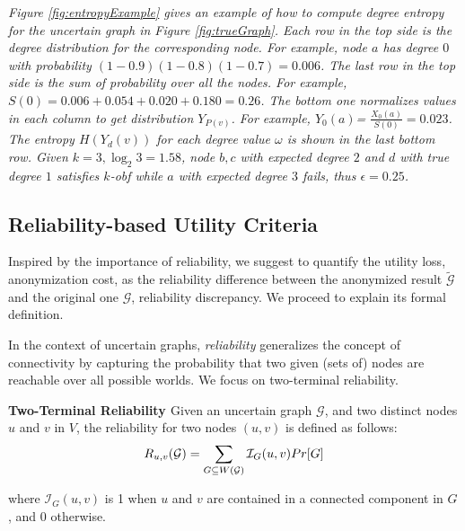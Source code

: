 {\emph{Figure \ref{fig:entropyExample}  gives an example of how to compute degree entropy for the uncertain graph in Figure \ref{fig:trueGraph}. Each row in the top side is the degree distribution for the corresponding node. For example, node $a$ has degree $0$ with probability $(1-0.9)(1-0.8)(1-0.7)=0.006$. The last row in the top side is the sum of probability over all the nodes. For example, $S(0)=0.006+0.054+0.020+0.180=0.26$.
The bottom one normalizes values in each column to get distribution $Y_{P(v)}$. For example, $Y_{0}(a)$= $\frac{X_{0}(a)}{S(0)}=0.023$. The entropy $H(Y_d(v))$ for each degree value $\omega$ is shown in the last bottom row. Given $k=3, \log_{2}{3}=1.58$, node $b,c$ with expected degree $2$ and $d$ with true degree $1$ satisfies $k$-obf while $a$ with expected degree $3$ fails, thus $\epsilon=0.25$. }

\subsection{Reliability-based Utility Criteria}
Inspired by the importance of reliability, we suggest to quantify the utility loss, anonymization cost, as the reliability difference between the anonymized result $\tilde{\mathcal{G}}$ and the original one $\mathcal{G}$, reliability discrepancy. We proceed to explain its formal definition. 

In the context of uncertain graphs, \emph{reliability} generalizes the concept of connectivity by  capturing the probability that two given (sets of) nodes are reachable over all possible worlds. We focus on two-terminal reliability. 
\begin{definition}
    \textbf{Two-Terminal Reliability \cite{Colbourn_Colbourn_1987}}  Given an uncertain graph $\mathcal{G}$, and two distinct nodes $u$ and $v$ in $V$, the reliability for two nodes $(u,v)$ is defined as follows:
        \vj
        \begin{equation*}
                R_{u,v}(\mathcal{G})= \sum_{G \subseteq W(\mathcal{G})}  \mathcal{I}_{G}(u,v) Pr[G] 
        \svj
        \end{equation*}
     
    where $\mathcal{I}_{G}(u,v)$ is 1 when $u$ and $v$ are contained in a connected component in $G$, and 0 otherwise.     
    \label{d:reliability}
\end{definition}

}

